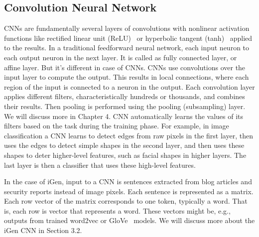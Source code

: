 \subsection{Convolution Neural Network}
CNNs are fundamentally several layers of convolutions with nonlinear activation functions like rectified linear unit (ReLU)~\cite{nair} or hyperbolic tangent (tanh)~\cite{goodfellow} applied to the results. In a traditional feedforward neural network, each input neuron to each output neuron in the next layer. It is called as fully connected layer, or affine layer. But it's different in case of CNNs. CNNs use convolutions over the input layer to compute the output. This results in local connections, where each region of the input is connected to a neuron in the output. Each convolution layer applies different filters, characteristically hundreds or thousands, and combines their results. Then pooling is performed using the pooling (subsampling) layer. We will discuss more in Chapter 4. CNN automatically learns the values of its filters based on the task during the training phase. For example, in image classification a CNN learns to detect edges from raw pixels in the first layer, then uses the edges to detect simple shapes in the second layer, and then uses these shapes to deter higher-level features, such as facial shapes in higher layers. The last layer is then a classifier that uses these high-level features. 



In the case of iGen, input to a CNN is sentences extracted from blog articles and security reports instead of image pixels. Each sentence is represented as a matrix. Each row vector of the matrix corresponds to one token, typically a word. That is, each row is vector that represents a word. These vectors might be, e.g., outputs from trained word2vec or GloVe~\cite{pennington} models. We will discuss more about the iGen CNN in Section 3.2. 



